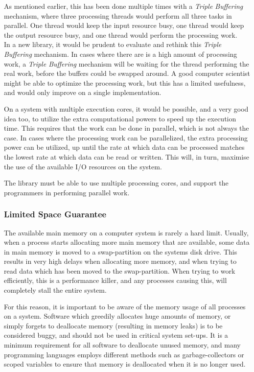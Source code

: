 \documentclass[a4paper]{article}
\begin{document}
As mentioned earlier, this has been done multiple times with a \textit{Triple Buffering} mechanism, where three processing threads would perform all three tasks in parallel. One thread would keep the input resource busy, one thread would keep the output resource busy, and one thread would perform the processing work.\\
 

In a new library, it would be prudent to evaluate and rethink this \textit{Triple Buffering} mechanism. In cases where there are is a high amount of processing work, a \textit{Triple Buffering} mechanism will be waiting for the thread performing the real work, before the buffers could be swapped around. A good computer scientist might be able to optimize the processing work, but this has a limited usefulness, and would only improve on a single implementation.

On a system with multiple execution cores, it would be possible, and a very good idea too, to utilize the extra computational powers to speed up the execution time. This requires that the work can be done in parallel, which is not always the case. In cases where the processing work can be parallelized, the extra processing power can be utilized, up until the rate at which data can be processed matches the lowest rate at which data can be read or written. This will, in turn, maximise the use of the available I/O resources on the system.

The library must be able to use multiple processing cores, and support the programmers in performing parallel work.


\subsubsection{Limited Space Guarantee}
The available main memory  on a computer system is rarely a hard limit. Usually, when a process starts allocating more main memory that are available, some data in main memory is moved to a swap-partition on the systems disk drive. This results in very high delays when allocating more memory, and when trying to read data which has been moved to the swap-partition. When trying to work efficiently, this is a performance killer, and any processes causing this, will completely stall the entire system. 

For this reason, it is important to be aware of the memory usage of all processes on a system. Software which greedily allocates huge amounts of memory, or simply forgets to deallocate memory (resulting in memory leaks) is to be considered buggy, and should not be used in critical system set-ups. It is a minimum requirement for all software to deallocate unused memory, and many programming languages employs different methods such as garbage-collectors or scoped variables to ensure that memory is deallocated when it is no longer used.\\
\end{document}
